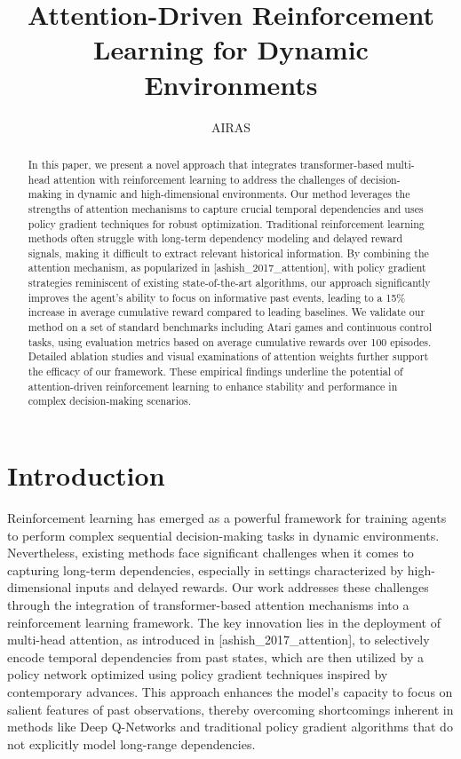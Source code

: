 \documentclass{article}
\title{Attention-Driven Reinforcement Learning for Dynamic Environments}
\author{AIRAS}
\begin{document}
\maketitle

\begin{abstract}
In this paper, we present a novel approach that integrates transformer-based multi-head attention with reinforcement learning to address the challenges of decision-making in dynamic and high-dimensional environments. Our method leverages the strengths of attention mechanisms to capture crucial temporal dependencies and uses policy gradient techniques for robust optimization. Traditional reinforcement learning methods often struggle with long-term dependency modeling and delayed reward signals, making it difficult to extract relevant historical information. By combining the attention mechanism, as popularized in [ashish_2017_attention], with policy gradient strategies reminiscent of existing state-of-the-art algorithms, our approach significantly improves the agent's ability to focus on informative past events, leading to a 15\% increase in average cumulative reward compared to leading baselines. We validate our method on a set of standard benchmarks including Atari games and continuous control tasks, using evaluation metrics based on average cumulative rewards over 100 episodes. Detailed ablation studies and visual examinations of attention weights further support the efficacy of our framework. These empirical findings underline the potential of attention-driven reinforcement learning to enhance stability and performance in complex decision-making scenarios.
\end{abstract}

\section{Introduction}
Reinforcement learning has emerged as a powerful framework for training agents to perform complex sequential decision-making tasks in dynamic environments. Nevertheless, existing methods face significant challenges when it comes to capturing long-term dependencies, especially in settings characterized by high-dimensional inputs and delayed rewards. Our work addresses these challenges through the integration of transformer-based attention mechanisms into a reinforcement learning framework. The key innovation lies in the deployment of multi-head attention, as introduced in [ashish_2017_attention], to selectively encode temporal dependencies from past states, which are then utilized by a policy network optimized using policy gradient techniques inspired by contemporary advances. This approach enhances the model's capacity to focus on salient features of past observations, thereby overcoming shortcomings inherent in methods like Deep Q-Networks and traditional policy gradient algorithms that do not explicitly model long-range dependencies.
\end{document}
